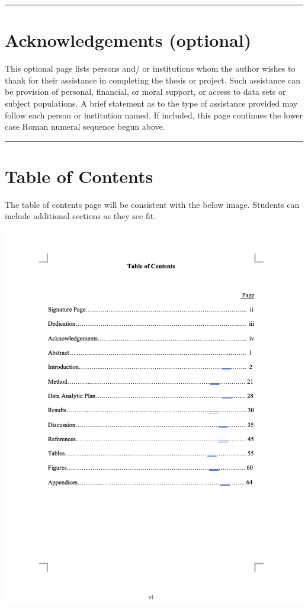 \documentclass[
  openany]{book}
\begin{document}
\begin{center}\rule{0.5\linewidth}{0.5pt}\end{center}

\hypertarget{acknowledgements-optional}{%
\section{Acknowledgements (optional)}\label{acknowledgements-optional}}

This optional page lists persons and/ or institutions whom the author wishes to thank for their assistance in completing the thesis or project. Such assistance can be provision of personal, financial, or moral support, or access to data sets or subject populations. A brief statement as to the type of assistance provided may follow each person or institution named. If included, this page continues the lower case Roman numeral sequence begun above.

\begin{center}\rule{0.5\linewidth}{0.5pt}\end{center}

\hypertarget{table-of-contents}{%
\section{Table of Contents}\label{table-of-contents}}

The table of contents page will be consistent with the below image. Students can include additional sections as they see fit.

\includegraphics{images/tablecontents.png}
\end{document}
